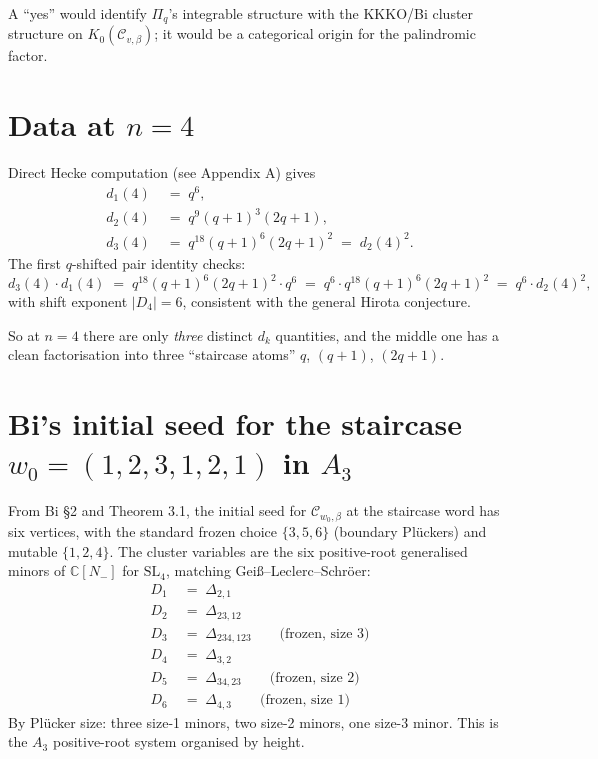 \documentclass{article}
\theoremstyle{definition}
\theoremstyle{remark}
\begin{document}
A ``yes'' would identify $\Pi_q$'s integrable structure with the KKKO/Bi cluster structure on $K_0(\mathcal{C}_{v,\beta})$; it would be a categorical origin for the palindromic factor.

\section{Data at $n=4$}

Direct Hecke computation (see Appendix A) gives
\begin{align}
d_1(4) &\;=\; q^6, \\
d_2(4) &\;=\; q^9 (q+1)^3 (2q+1), \\
d_3(4) &\;=\; q^{18} (q+1)^6 (2q+1)^2 \;=\; d_2(4)^2.
\end{align}
The first $q$-shifted pair identity checks:
$$d_3(4) \cdot d_1(4) \;=\; q^{18}(q+1)^6(2q+1)^2 \cdot q^6 \;=\; q^6 \cdot q^{18}(q+1)^6(2q+1)^2 \;=\; q^6 \cdot d_2(4)^2,$$
with shift exponent $|D_4| = 6$, consistent with the general Hirota conjecture.

So at $n=4$ there are only \emph{three} distinct $d_k$ quantities, and the middle one has a clean factorisation into three ``staircase atoms'' $q$, $(q+1)$, $(2q+1)$.

\section{Bi's initial seed for the staircase $w_0 = (1,2,3,1,2,1)$ in $A_3$}

From Bi \S 2 and Theorem 3.1, the initial seed for $\mathcal{C}_{w_0,\beta}$ at the staircase word has six vertices, with the standard frozen choice $\{3,5,6\}$ (boundary Pl\"uckers) and mutable $\{1,2,4\}$. The cluster variables are the six positive-root generalised minors of $\mathbb{C}[N_-]$ for $\mathrm{SL}_4$, matching Gei\ss--Leclerc--Schr\"oer:
\begin{align}
D_1 &\;=\; \Delta_{2,1} \\
D_2 &\;=\; \Delta_{23,12} \\
D_3 &\;=\; \Delta_{234,123} \qquad \text{(frozen, size 3)} \\
D_4 &\;=\; \Delta_{3,2} \\
D_5 &\;=\; \Delta_{34,23} \qquad \text{(frozen, size 2)} \\
D_6 &\;=\; \Delta_{4,3} \qquad \text{(frozen, size 1)}
\end{align}
By Pl\"ucker size: three size-1 minors, two size-2 minors, one size-3 minor. This is the $A_3$ positive-root system organised by height.
\end{document}
